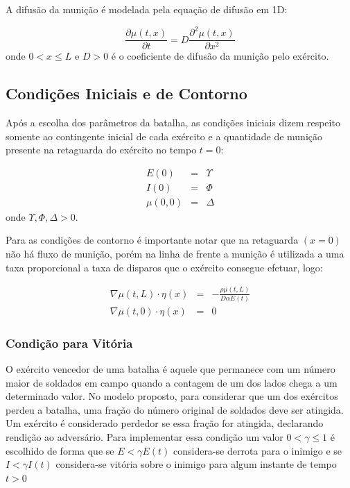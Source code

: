\documentclass{article}
\begin{document}
A difusão da munição é modelada pela equação de difusão em 1D:

\begin{equation}
	\frac{\partial \mu (t,x)}{\partial t} = D \frac{\partial^2 \mu (t,x) }{\partial x^2}
	\label{eq:diffusion}
\end{equation}
onde $0 < x \leq L$ e $D > 0$ é o coeficiente de difusão da munição pelo exército.

\subsection{Condições Iniciais e de Contorno}
Após a escolha dos parâmetros da batalha, as condições iniciais dizem respeito somente ao contingente inicial de cada exército e a quantidade de munição presente na retaguarda do exército no tempo $t = 0$:

\begin{eqnarray}
	E(0) &=& \Upsilon \\
	I(0) &=& \Phi \nonumber \\
	\mu(0,0) &=& \Delta \nonumber
	\label{eq:initial-cond}
\end{eqnarray}
onde $\Upsilon, \Phi, \Delta > 0$.

Para as condições de contorno é importante notar que na retaguarda $(x=0)$ não há fluxo de munição, porém na linha de frente a munição é utilizada a uma taxa proporcional a taxa de disparos que o exército consegue efetuar, logo:

\begin{eqnarray}
	\nabla \mu(t,L) \cdot \eta(x) &=& -\frac{\rho \mu(t,L)}{D \alpha E(t)} \\
	\nabla \mu(t,0) \cdot \eta(x) &=& 0 \nonumber
\end{eqnarray}

\subsubsection{Condição para Vitória}

O exército vencedor de uma batalha é aquele que permanece com um número maior de soldados em campo quando a contagem de um dos lados chega a um determinado valor. No modelo proposto, para considerar que um dos exércitos perdeu a batalha, uma fração do número original de soldados deve ser atingida. Um exército é considerado perdedor se essa fração for atingida, declarando rendição ao adversário. Para implementar essa condição um valor $0 < \gamma \leq 1$ é escolhido de forma que se $E < \gamma E(t)$ considera-se derrota para o inimigo e se $I < \gamma I(t)$ considera-se vitória sobre o inimigo para algum instante de tempo $t>0$
\end{document}
